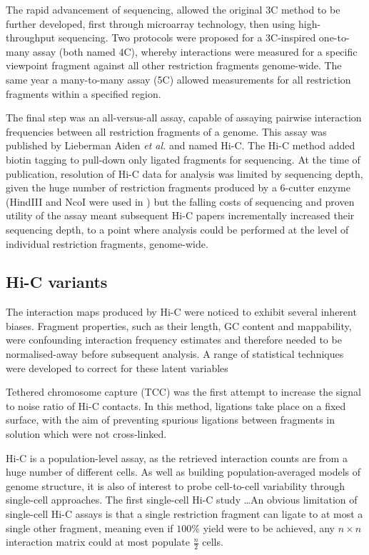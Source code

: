 \documentclass[a4paper,10pt,oneside]{book}
\begin{document}
The rapid advancement of sequencing, allowed the original 3C method to be further developed, first through microarray technology, then using high-throughput sequencing. Two protocols were proposed for a 3C-inspired one-to-many assay\cite{Zhao2006, Simonis2006} (both named 4C), whereby interactions were measured for a specific viewpoint fragment against all other restriction fragments genome-wide. The same year a many-to-many assay (5C) allowed measurements for all restriction fragments within a specified region.\cite{Dostie2006} 

The final step was an all-versus-all assay, capable of assaying pairwise interaction frequencies between all restriction fragments of a genome. This assay was published by Lieberman Aiden \emph{et al.}\cite{Lieberman2009} and named Hi-C. The Hi-C method added biotin tagging to pull-down only ligated fragments for sequencing. At the time of publication, resolution of Hi-C data for analysis was limited by sequencing depth, given the huge number of restriction fragments produced by a 6-cutter enzyme (HindIII and NcoI were used in \cite{Lieberman2009}) but the falling costs of sequencing and proven utility of the assay meant subsequent Hi-C papers incrementally increased their sequencing depth, to a point where analysis could be performed at the level of individual restriction fragments, genome-wide.\cite{Dixon2012,  Selvaraj2013a, Jin2013, Rao2014}

\subsection{Hi-C variants}

The interaction maps produced by Hi-C were noticed to exhibit several inherent biases. Fragment properties, such as their length, GC content and mappability, were confounding interaction frequency estimates and therefore needed to be normalised-away before subsequent analysis.\cite{Yaffe2011} A range of statistical techniques were developed to correct for these latent variables\cite{Imakaev2012, Dekker2013, Hu2012, Li2014}

Tethered chromosome capture (TCC)\cite{Kalhor2012} was the first attempt to increase the signal to noise ratio of Hi-C contacts. In this method, ligations take place on a fixed surface, with the aim of preventing spurious ligations between fragments in solution which were not cross-linked.

Hi-C is a population-level assay, as the retrieved interaction counts are from a huge number of different cells. As well as building population-averaged models of genome structure, it is also of interest to probe cell-to-cell variability through single-cell approaches. The first single-cell Hi-C study\cite{Nagano2013} \ldots An obvious limitation of single-cell Hi-C assays is that a single restriction fragment can ligate to at most a single other fragment, meaning even if $100\%$ yield were to be achieved, any $n \times n$ interaction matrix could at most populate $\frac{n}{2}$ cells.
\end{document}
